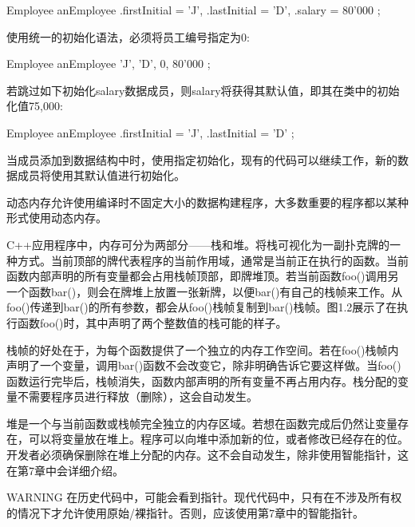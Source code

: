 \begin{cpp}
Employee anEmployee {
    .firstInitial = 'J',
    .lastInitial = 'D',
    .salary = 80'000
};
\end{cpp}

使用统一的初始化语法，必须将员工编号指定为0:

\begin{cpp}
Employee anEmployee { 'J', 'D', 0, 80'000 };
\end{cpp}

若跳过如下初始化salary数据成员，则salary将获得其默认值，即其在类中的初始化值75,000:

\begin{cpp}
Employee anEmployee {
    .firstInitial = 'J',
    .lastInitial = 'D'
};
\end{cpp}

当成员添加到数据结构中时，使用指定初始化，现有的代码可以继续工作，新的数据成员将使用其默认值进行初始化。


动态内存允许使用编译时不固定大小的数据构建程序，大多数重要的程序都以某种形式使用动态内存。


C++应用程序中，内存可分为两部分——栈和堆。将栈可视化为一副扑克牌的一种方式。当前顶部的牌代表程序的当前作用域，通常是当前正在执行的函数。当前函数内部声明的所有变量都会占用栈帧顶部，即牌堆顶。若当前函数foo()调用另一个函数bar()，则会在牌堆上放置一张新牌，以便bar()有自己的栈帧来工作。从foo()传递到bar()的所有参数，都会从foo()栈帧复制到bar()栈帧。图1.2展示了在执行函数foo()时，其中声明了两个整数值的栈可能的样子。


栈帧的好处在于，为每个函数提供了一个独立的内存工作空间。若在foo()栈帧内声明了一个变量，调用bar()函数不会改变它，除非明确告诉它要这样做。当foo()函数运行完毕后，栈帧消失，函数内部声明的所有变量不再占用内存。栈分配的变量不需要程序员进行释放（删除），这会自动发生。

堆是一个与当前函数或栈帧完全独立的内存区域。若想在函数完成后仍然让变量存在，可以将变量放在堆上。程序可以向堆中添加新的位，或者修改已经存在的位。开发者必须确保删除在堆上分配的内存。这不会自动发生，除非使用智能指针，这在第7章中会详细介绍。

\begin{myWarning}{WARNING}
在历史代码中，可能会看到指针。现代代码中，只有在不涉及所有权的情况下才允许使用原始/裸指针。否则，应该使用第7章中的智能指针。
\end{myWarning}

